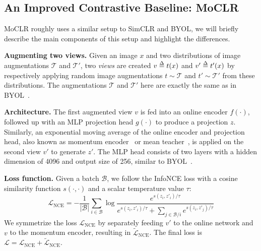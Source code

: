 \documentclass[final]{cvpr}
\def\delequal{\mathrel{\ensurestackMath{\stackon[1pt]{=}{\scriptstyle\Delta}}}}
\newcommand\baseline{MoCLR}
\begin{document}
\subsection{An Improved Contrastive Baseline: \baseline{}}
\label{section:baseline}

\baseline{} roughly uses a similar setup to SimCLR and BYOL, we will briefly describe the main components of this setup and highlight the differences.


\noindent\textbf{Augmenting two views.} Given an image $x$ and two distributions of image augmentations $\mathcal{T}$ and $\mathcal{T}'$, two \emph{views} are created $v\delequal t(x)$ and $v'\delequal t'(x)$ by respectively applying random image augmentations $t\sim \mathcal{T}$ and $t'\sim \mathcal{T'}$ from these distributions. 
The augmentations $\mathcal{T}$ and $\mathcal{T}'$ here are exactly the same as in BYOL~\cite{grill2020bootstrap}.


\noindent\textbf{Architecture.}
The first augmented view $v$ is fed into an online encoder $f(\cdot)$, followed up with an MLP projection head $g(\cdot)$ to produce a projection $z$. Similarly, an exponential moving average of the online encoder and projection head, also known as momentum encoder~\cite{he2020momentum} or mean teacher~\cite{tarvainen2017mean}, is applied on the second view $v'$ to generate $z'$. The MLP head consists of two layers with a hidden dimension of 4096 and output size of 256, similar to BYOL~\cite{grill2020bootstrap}. 

\noindent\textbf{Loss function.} Given a batch $\mathcal{B}$, we follow the InfoNCE loss \cite{oord2018representation} with a cosine similarity function $s(\cdot,\cdot)$ and a scalar temperature value $\tau$:
\begin{equation}\label{eq:infonce_loss}
    \mathcal{L}_\text{NCE} = -\frac{1}{|\mathcal{B}|}\sum_{i \in \mathcal{B}}\log \frac{e^{s(z_i, z'_i)/\tau}}{e^{s(z_i, z'_i)/\tau} + \sum_{j \in \mathcal{B}/i}e^{s(z_i, z'_j)/\tau}}
\end{equation}
We symmetrize the loss $\mathcal{L}_\text{NCE}$ by separately feeding $v'$ to the online network and $v$ to the momentum encoder, resulting in $\widetilde{\mathcal{L}}_\text{NCE}$. 
The final loss is $\mathcal{L} = \mathcal{L}_\text{NCE} + \widetilde{\mathcal{L}}_\text{NCE}$. 
\end{document}

